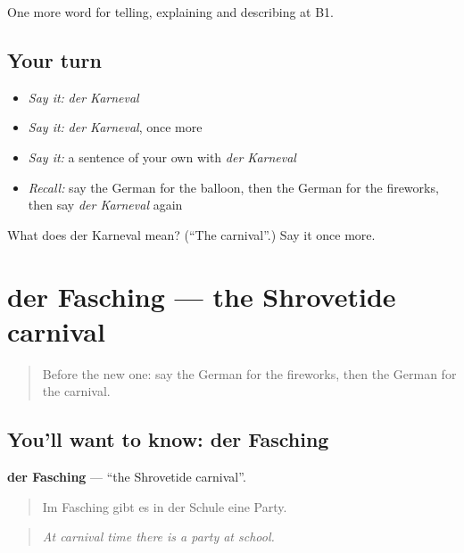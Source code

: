\begin{grammarlens}[title={What you've built}]
One more word for telling, explaining and describing at B1.
\end{grammarlens}

\subsection*{Your turn}
\begin{itemize}
\raggedright
  \item \emph{Say it:} \emph{der Karneval}
  \item \emph{Say it:} \emph{der Karneval}, once more
  \item \emph{Say it:} a sentence of your own with \emph{der Karneval}
  \item \emph{Recall:} say the German for the balloon, then the German for the fireworks, then say \emph{der Karneval} again
\end{itemize}

\begin{tcolorbox}[breakable,colback=teal!4,colframe=teal!35!black,title={Before you move on}]
What does der Karneval mean? (\textquotedblleft{}The carnival\textquotedblright{}.) Say it once more.
\end{tcolorbox}
\section[der Fasching]{der Fasching — the Shrovetide carnival}

\label{lesson:GE-C310-fasching}



\begin{quote}
Before the new one: say the German for the fireworks, then the German for the carnival.
\end{quote}

\subsection*{You'll want to know: der Fasching}
\textbf{der Fasching} — \textquotedblleft{}the Shrovetide carnival\textquotedblright{}.

\begin{quote}
Im Fasching gibt es in der Schule eine Party.
\end{quote}

\begin{quote}
\emph{At carnival time there is a party at school.}
\end{quote}

